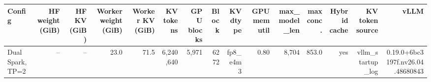 \begin{tabular}{l r r r r r r r r r r r r r r }
\toprule
Config & HF weight (GiB) & HF KV (GiB) & Worker weight (GiB) & Worker KV (GiB) & KV tokens & GPU blocks & Block & KV dtype & GPU mem util & max\_model\_len & max conc. & Hybrid cache & KV token source & vLLM \\
\midrule
Dual Spark, TP=2 & -- & -- & 23.0 & 71.5 & 6,240,640 & 5,971 & 6272 & fp8\_e4m3 & 0.80 & 8,704 & 853.0 & yes & vllm\_startup\_log & 0.19.0+6bc3197f.nv26.04.48680843 \\
\bottomrule
\end{tabular}
